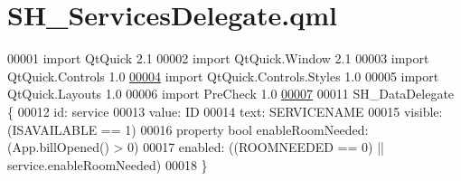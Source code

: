 \hypertarget{SH__ServicesDelegate_8qml}{\section{S\-H\-\_\-\-Services\-Delegate.\-qml}
\label{SH__ServicesDelegate_8qml}
}

\begin{DoxyCode}
00001 \textcolor{keyword}{import} QtQuick 2.1
00002 import QtQuick.Window 2.1
00003 import QtQuick.Controls 1.0
\hypertarget{SH__ServicesDelegate_8qml_source_l00004}{}\hyperlink{classSH__ServicesDelegate}{00004} import QtQuick.Controls.Styles 1.0
00005 import QtQuick.Layouts 1.0
00006 import PreCheck 1.0
\hypertarget{SH__ServicesDelegate_8qml_source_l00007}{}\hyperlink{classSH__ServicesDelegate_a8567cacba7b48a3c1f71e6fa6dfb9f74}{00007} 
00011 SH\_DataDelegate \{
00012     \textcolor{keywordtype}{id}: service
00013     value: ID
00014     text: SERVICENAME
00015     visible: (ISAVAILABLE == 1)
00016     property \textcolor{keywordtype}{bool} enableRoomNeeded: (App.billOpened() > 0)
00017     enabled: ((ROOMNEEDED == 0) || service.enableRoomNeeded)
00018 \}
\end{DoxyCode}
